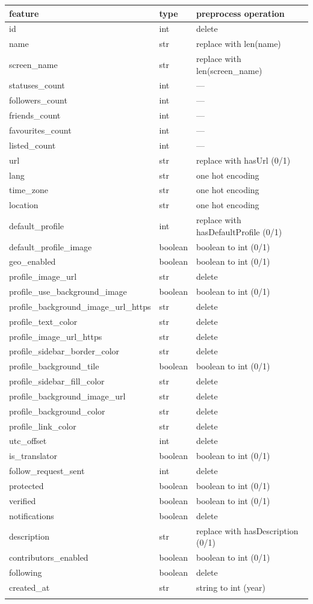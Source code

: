 \small
\begin{center}
	\begin{tabular}{lll}
		\\feature&type&preprocess operation\\
		\hline\hline
		id&int&delete\\
		name&str&replace with len(name)\\
		screen\_name&str&replace with len(screen\_name)\\
		statuses\_count&int&---\\
		followers\_count&int&---\\
		friends\_count&int&---\\
		favourites\_count&int&---\\
		listed\_count&int&---\\
		url&str&replace with hasUrl (0/1)\\
		lang&str&one hot encoding\\
		time\_zone&str&one hot encoding\\
		location&str&one hot encoding\\
		default\_profile&int&replace with hasDefaultProfile (0/1)\\
		default\_profile\_image&boolean&boolean to int (0/1)\\
		geo\_enabled&boolean&boolean to int (0/1)\\
		profile\_image\_url&str&delete\\
		profile\_use\_background\_image&boolean&boolean to int (0/1)\\
		profile\_background\_image\_url\_https&str&delete\\
		profile\_text\_color&str&delete\\
		profile\_image\_url\_https&str&delete\\
		profile\_sidebar\_border\_color&str&delete\\
		profile\_background\_tile&boolean&boolean to int (0/1)\\
		profile\_sidebar\_fill\_color&str&delete\\
		profile\_background\_image\_url&str&delete\\
		profile\_background\_color&str&delete\\
		profile\_link\_color&str&delete\\
		utc\_offset&int&delete\\
		is\_translator&boolean&boolean to int (0/1)\\
		follow\_request\_sent&int&delete\\
		protected&boolean&boolean to int (0/1)\\
		verified&boolean&boolean to int (0/1)\\
		notifications&boolean&delete\\
		description&str&replace with hasDescription (0/1)\\
		contributors\_enabled&boolean&boolean to int (0/1)\\
		following&boolean&delete\\
		created\_at&str&string to int (year)\\\hline\\
	\end{tabular}
\end{center}

